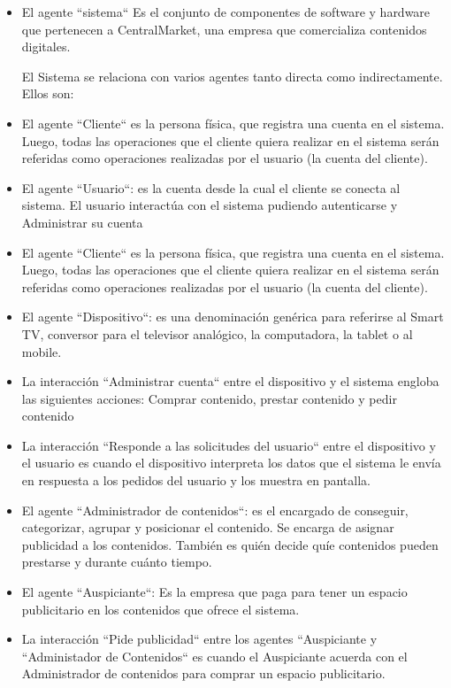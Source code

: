 \documentclass[11pt, a4paper, spanish]{article}
\begin{document}
\begin{itemize}

\item  {El agente ``sistema`` Es el conjunto de componentes de software y hardware que pertenecen a CentralMarket, una empresa que comercializa contenidos digitales.}

El Sistema se relaciona con varios agentes tanto directa como indirectamente. Ellos son:

\item El agente ``Cliente`` es la persona f\'isica, que registra una cuenta en el sistema. Luego, todas las operaciones que el cliente quiera realizar en el sistema ser\'an referidas como operaciones realizadas por el usuario (la cuenta del cliente).

\item El agente ``Usuario``: es la cuenta desde la cual el cliente se conecta al sistema. El usuario interact\'ua con el sistema pudiendo autenticarse y Administrar su cuenta

\item El agente ``Cliente`` es la persona f\'isica, que registra una cuenta en el sistema. Luego, todas las operaciones que el cliente quiera realizar en el sistema ser\'an referidas como operaciones realizadas por el usuario (la cuenta del cliente).

\item El agente ``Dispositivo``: es una denominaci\'on gen\'erica para referirse al Smart TV, conversor para el televisor anal\'ogico, la computadora, la tablet o al mobile. 

\item La interacci\'on ``Administrar cuenta`` entre el dispositivo y el sistema engloba las siguientes acciones: Comprar contenido, prestar contenido y pedir contenido


\item La interacci\'on ``Responde a las solicitudes del usuario`` entre el dispositivo y el usuario es cuando el dispositivo interpreta los datos que el sistema le env\'ia en respuesta a los pedidos del usuario y los muestra en pantalla.	 
   
\item El agente ``Administrador de contenidos``: es el encargado de conseguir, categorizar, agrupar y posicionar el contenido. Se encarga de asignar publicidad a los contenidos. Tambi\'en es qui\'en decide qu\'ie contenidos pueden prestarse y durante cu\'anto tiempo.

\item El agente ``Auspiciante``: Es la empresa que paga para tener un espacio publicitario en los contenidos que ofrece el sistema.
\item La interacci\'on ``Pide publicidad`` entre los agentes ``Auspiciante y ``Administador de Contenidos`` es cuando el Auspiciante acuerda con el Administrador de contenidos para comprar un espacio publicitario.
  

\end{itemize}
\end{document}
